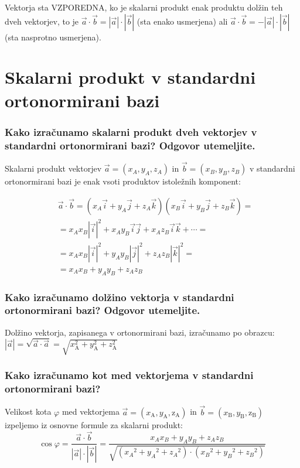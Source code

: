\documentclass{article}
\begin{document}
Vektorja sta VZPOREDNA, ko je skalarni produkt enak produktu dolžin teh dveh vektorjev, to je $\overrightarrow{a} \cdot \overrightarrow{b}=|\overrightarrow{a}| \cdot|\overrightarrow{b}|$ (sta enako usmerjena) ali $\overrightarrow{a} \cdot \overrightarrow{b}=-|\overrightarrow{a}| \cdot|\overrightarrow{b}|$ (sta nasprotno usmerjena).

\section{Skalarni produkt v standardni ortonormirani bazi}
\subsubsection*{Kako izračunamo skalarni produkt dveh vektorjev v standardni ortonormirani bazi? Odgovor utemeljite.}

Skalarni produkt vektorjev $\vec{a}=\left(x_{A}, y_{A}, z_{A}\right)$ in $\vec{b}=\left(x_{B}, y_{B}, z_{B}\right)$ v standardni ortonormirani bazi je enak vsoti produktov istoležnih komponent:

$$
\begin{aligned}
& \vec{a} \cdot \vec{b} = (x_A\vec{i} + y_A\vec{j} + z_A\vec{k})(x_B\vec{i} + y_B\vec{j} + z_B\vec{k}) = \\
& = x_Ax_B|\vec{i}|^2 + x_Ay_B\vec{i}\vec{j} + x_Az_B\vec{i}\vec{k} + \cdots = \\
& = x_Ax_B|\vec{i}|^2 + y_Ay_B|\vec{j}|^2 + z_Az_B|\vec{k}|^2 = \\
& = x_Ax_B + y_Ay_B + z_Az_B
\end{aligned}
$$

\subsubsection*{Kako izračunamo dolžino vektorja v standardni ortonormirani bazi? Odgovor utemeljite.}

Dolžino vektorja, zapisanega v ortonormirani bazi, izračunamo po obrazcu: $|\overrightarrow{a}|=\sqrt{\overrightarrow{a} \cdot \overrightarrow{a}}=\sqrt{x_{\mathrm{A}}^{2}+y_{\mathrm{A}}^{2}+z_{\mathrm{A}}^{2}}$

\subsubsection*{Kako izračunamo kot med vektorjema v standardni ortonormirani bazi?}

Velikost kota $\varphi$ med vektorjema $\overrightarrow{a}=\left(x_{\mathrm{A}}, y_{\mathrm{A}}, \mathrm{z}_{\mathrm{A}}\right)$ in $\overrightarrow{b}=\left(x_{\mathrm{B}}, y_{\mathrm{B}}, \mathrm{z}_{\mathrm{B}}\right)$ izpeljemo iz osnovne formule za skalarni produkt: 
$$\cos \varphi=\frac{\vec{a} \cdot \vec{b}}{|\vec{a}| \cdot|\vec{b}|}=\frac{x_{A} x_{B}+y_{A} y_{B}+z_{A} z_{B}}{\sqrt{\left(x_{A}{ }^{2}+y_{A}{ }^{2}+z_{A}{ }^{2}\right) \cdot\left(x_{B}{ }^{2}+y_{B}{ }^{2}+z_{B}{ }^{2}\right)}}$$
\end{document}
